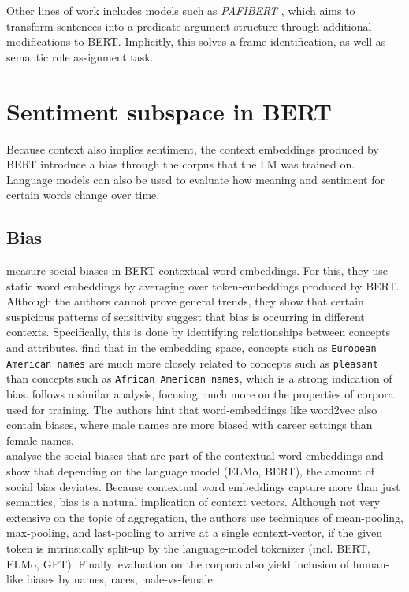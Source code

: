 \documentclass[a4paper,12pt,oneside,openright]{report}
\begin{document}
Other lines of work includes models such as \textit{PAFIBERT} \cite{tan19}, which aims to transform sentences into a predicate-argument structure through additional modifications to BERT.
Implicitly, this solves a frame identification, as well as semantic role assignment task. \\

\section{Sentiment subspace in BERT}

Because context also implies sentiment, the context embeddings produced by BERT introduce a bias through the corpus that the LM was trained on.
Language models can also be used to evaluate how meaning and sentiment for certain words change over time.

\subsection{Bias} 

\cite{may19} measure social biases in BERT contextual word embeddings.
For this, they use static word embeddings by averaging over token-embeddings produced by BERT.
Although the authors cannot prove general trends, they show that certain suspicious patterns of sensitivity suggest that bias is occurring in different contexts.
Specifically, this is done by identifying relationships between concepts and attributes. 
\cite{may19, caliskan19} find that in the embedding space, concepts such as \texttt{European American names} are much more closely related to concepts such as \texttt{pleasant} than concepts such as \texttt{African American names}, which is a strong indication of bias.
\cite{caliskan19} follows a similar analysis, focusing much more on the properties of corpora used for training.
The authors hint that word-embeddings like word2vec also contain biases, where male names are more biased with career settings than female names. \\

\cite{may19} analyse the social biases that are part of the contextual word embeddings and show that depending on the language model (ELMo, BERT), the amount of social bias deviates. 
Because contextual word embeddings capture more than just semantics, bias is a natural implication of context vectors.
Although not very extensive on the topic of aggregation, the authors use techniques of mean-pooling, max-pooling, and last-pooling to arrive at a single context-vector, if the given token is intrinsically split-up by the language-model tokenizer (incl. BERT, ELMo, GPT).
Finally, evaluation on the corpora also yield inclusion of human-like biases \cite{jentzsch19} by names, races, male-vs-female. \\
\end{document}
